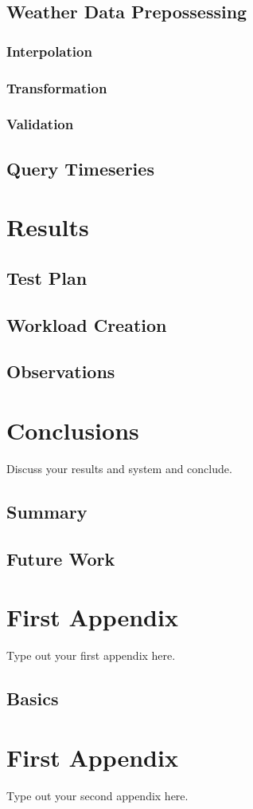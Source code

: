 \documentclass[a4paper,oneside,12pt]{report}
\begin{document}
\section{Weather Data Prepossessing}

\subsection{Interpolation}

\subsection{Transformation}

\subsection{Validation}

\section{Query Timeseries}

\chapter{Results}
\label{ch:results}

\section{Test Plan}

\section{Workload Creation}

\section{Observations}

\chapter{Conclusions}
\label{ch:summary}

Discuss your results and system and conclude.

\section{Summary}

\section{Future Work}

\appendix
\chapter{First Appendix}
Type out your first appendix here.
\section{Basics}

\chapter{First Appendix}
Type out your second appendix here.

\graphicspath{ {./images/} }



\end{document}
